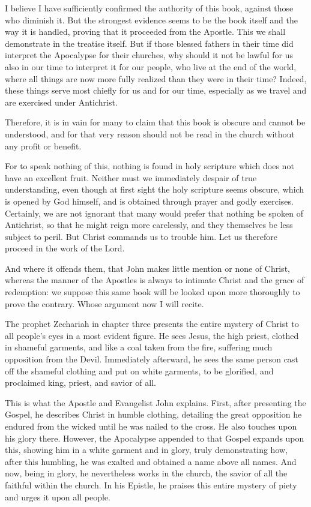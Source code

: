I believe I have sufficiently confirmed the authority of this book, against those who diminish it. But the strongest evidence seems to be the book itself and the way it is handled, proving that it proceeded from the Apostle. This we shall demonstrate in the treatise itself. But if those blessed fathers in their time did interpret the Apocalypse for their churches, why should it not be lawful for us also in our time to interpret it for our people, who live at the end of the world, where all things are now more fully realized than they were in their time? Indeed, these things serve most chiefly for us and for our time, especially as we travel and are exercised under Antichrist.

Therefore, it is in vain for many to claim that this book is obscure and cannot be understood, and for that very reason should not be read in the church without any profit or benefit.

For to speak nothing of this, nothing is found in holy scripture which does not have an excellent fruit. Neither must we immediately despair of true understanding, even though at first sight the holy scripture seems obscure, which is opened by God himself, and is obtained through prayer and godly exercises. Certainly, we are not ignorant that many would prefer that nothing be spoken of Antichrist, so that he might reign more carelessly, and they themselves be less subject to peril. But Christ commands us to trouble him. Let us therefore proceed in the work of the Lord.

And where it offends them, that John makes little mention or none of Christ, whereas the manner of the Apostles is always to intimate Christ and the grace of redemption: we suppose this same book will be looked upon more thoroughly to prove the contrary. Whose argument now I will recite.

The prophet Zechariah in chapter three presents the entire mystery of Christ to all people’s eyes in a most evident figure. He sees Jesus, the high priest, clothed in shameful garments, and like a coal taken from the fire, suffering much opposition from the Devil. Immediately afterward, he sees the same person cast off the shameful clothing and put on white garments, to be glorified, and proclaimed king, priest, and savior of all.

This is what the Apostle and Evangelist John explains. First, after presenting the Gospel, he describes Christ in humble clothing, detailing the great opposition he endured from the wicked until he was nailed to the cross. He also touches upon his glory there. However, the Apocalypse appended to that Gospel expands upon this, showing him in a white garment and in glory, truly demonstrating how, after this humbling, he was exalted and obtained a name above all names. And now, being in glory, he nevertheless works in the church, the savior of all the faithful within the church. In his Epistle, he praises this entire mystery of piety and urges it upon all people.

